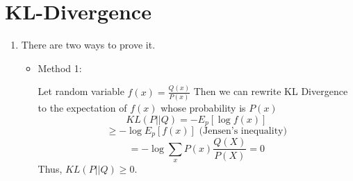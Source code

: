 \documentclass[a4paper, 10pt, titlepage]{article}
\begin{document}
\section{KL-Divergence}
\begin{enumerate}
    \item There are two ways to prove it.

        \begin{itemize}
                \item Method 1:

                    Let random variable $f(x) = \frac{Q(x)}{P(x)}$ Then we can rewrite KL Divergence to the expectation of $f(x)$ whose probability is $P(x)$
                    $$KL(P||Q) = -E_p[\log{f(x)}] $$
                    $$\geq-\log{E_p[f(x)]}\mbox{~(Jensen's inequality)}$$
                    $$=-\log{\sum_xP(x)\frac{Q(X)}{P(X)}}=0$$
                    Thus, $KL(P||Q) \geq 0$.


\end{itemize}
\end{enumerate}
\end{document}

